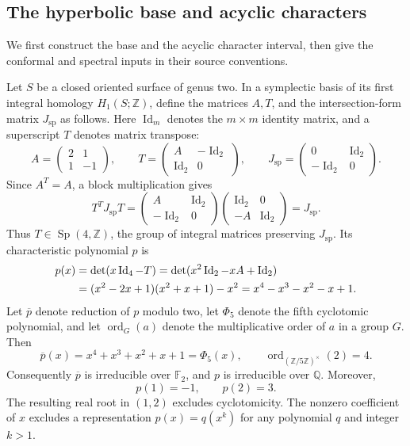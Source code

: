 \documentclass[11pt,letterpaper,reqno]{amsart}
\theoremstyle{remark}
\newcommand{\Id}{\operatorname{Id}}
\begin{document}
\subsection{The hyperbolic base and acyclic characters}\label{app:base}

We first construct the base and the acyclic character interval,
then give the conformal and spectral inputs in their source conventions.



Let $S$ be a closed oriented surface of genus two. In a symplectic basis
of its first integral homology $H_1(S;\mathbb Z)$, define the matrices
$A,T$, and the intersection-form matrix $J_{\mathrm{sp}}$ as follows.
Here $\Id_m$ denotes the $m\times m$ identity matrix, and a superscript
$T$ denotes matrix transpose:
\begin{equation}\label{app:matrix}
 A=\begin{pmatrix}2&1\\1&-1\end{pmatrix},\qquad
 T=\begin{pmatrix}A&-\Id_2\\\Id_2&0\end{pmatrix},\qquad
 J_{\mathrm{sp}}=\begin{pmatrix}0&\Id_2\\-\Id_2&0\end{pmatrix}.
\end{equation}
Since $A^T=A$, a block multiplication gives
\begin{equation}\label{app:symplectic}
 T^TJ_{\mathrm{sp}}T
 =\begin{pmatrix}A&\Id_2\\-\Id_2&0\end{pmatrix}
  \begin{pmatrix}\Id_2&0\\-A&\Id_2\end{pmatrix}
 =J_{\mathrm{sp}}.
\end{equation}
Thus $T\in\operatorname{Sp}(4,\mathbb Z)$, the group of integral matrices
preserving $J_{\mathrm{sp}}$. Its characteristic polynomial $p$ is
\begin{align}\label{app:polynomial}
 p(x)&=\det(x\Id_4-T)
      =\det(x^2\Id_2-xA+\Id_2)\notag\\
     &=(x^2-2x+1)(x^2+x+1)-x^2
      =x^4-x^3-x^2-x+1.
\end{align}
Let $\overline p$ denote reduction of $p$ modulo two, let $\Phi_5$ denote
the fifth cyclotomic polynomial, and let $\operatorname{ord}_G(a)$ denote
the multiplicative order of $a$ in a group $G$. Then
\begin{equation}\label{app:irreducible}
 \overline p(x)=x^4+x^3+x^2+x+1=\Phi_5(x),\qquad
 \operatorname{ord}_{(\mathbb Z/5\mathbb Z)^\times}(2)=4.
\end{equation}
Consequently $\overline p$ is irreducible over $\mathbb F_2$, and $p$
is irreducible over $\mathbb Q$. Moreover,
\begin{equation}\label{app:noncyclotomic}
 p(1)=-1,\qquad p(2)=3.
\end{equation}
The resulting real root in $(1,2)$ excludes cyclotomicity. The nonzero
coefficient of $x$ excludes a representation $p(x)=q(x^k)$ for any
polynomial $q$ and integer $k>1$.
\end{document}

